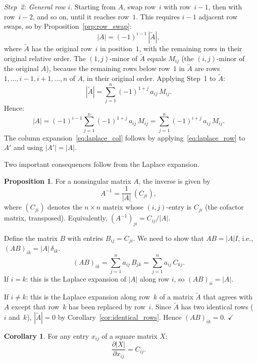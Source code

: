 \documentclass[12pt,a4paper]{article}
\makeatletter
\theoremstyle{definition}
\newtheorem{proposition}{Proposition}
\newtheorem{corollary}{Corollary}
\renewenvironment{proof}[1][\proofname]{\par
  \pushQED{\qed}%
  \normalfont \topsep6\p@\@plus6\p@\relax
  \trivlist
  \item[\hskip\labelsep\bfseries #1\@addpunct{.}]\ignorespaces
}{%
  \popQED\endtrivlist\@endpefalse
}
\makeatother
\begin{document}
\begin{proof}
\emph{Step~2: General row $i$.}
Starting from $A$, swap row~$i$ with row~$i-1$, then with row~$i-2$, and so on, until it reaches row~$1$. This requires $i - 1$ adjacent row swaps, so by Proposition~\ref{prp:row_swap}:
\[
|A| = (-1)^{i-1}\, |\tilde{A}|,
\]
where $\tilde{A}$ has the original row~$i$ in position~$1$, with the remaining rows in their original relative order. The $(1,j)$-minor of $\tilde{A}$ equals $M_{ij}$ (the $(i,j)$-minor of the original $A$), because the remaining rows below row~$1$ in $\tilde{A}$ are rows $1, \dots, i{-}1, i{+}1, \dots, n$ of $A$, in their original order. Applying Step~1 to $\tilde{A}$:
\[
|\tilde{A}| = \sum_{j=1}^{n} (-1)^{1+j}\, a_{ij}\, M_{ij}.
\]
Hence:
\[
|A| = (-1)^{i-1} \sum_{j=1}^{n} (-1)^{1+j}\, a_{ij}\, M_{ij} = \sum_{j=1}^{n} (-1)^{i+j}\, a_{ij}\, M_{ij}.
\]
The column expansion~\eqref{eq:laplace_col} follows by applying~\eqref{eq:laplace_row} to $A'$ and using $|A'| = |A|$.
\end{proof}

Two important consequences follow from the Laplace expansion.

\begin{proposition}\label{prp:cofactor_inverse}
For a nonsingular matrix $A$, the inverse is given by
\[
A^{-1} = \frac{1}{|A|}\, (C_{ji}),
\]
where $(C_{ji})$ denotes the $n \times n$ matrix whose $(i,j)$-entry is $C_{ji}$ (the cofactor matrix, transposed). Equivalently, $(A^{-1})_{ji} = C_{ij}/|A|$.
\end{proposition}

\begin{proof}
Define the matrix $B$ with entries $B_{ij} = C_{ji}$. We need to show that $AB = |A| I$, i.e., $(AB)_{ik} = |A|\, \delta_{ik}$.
\[
(AB)_{ik} = \sum_{j=1}^{n} a_{ij}\, B_{jk} = \sum_{j=1}^{n} a_{ij}\, C_{kj}.
\]
If $i = k$: this is the Laplace expansion of $|A|$ along row $i$, so $(AB)_{ii} = |A|$.

If $i \neq k$: this is the Laplace expansion along row~$k$ of a matrix $\tilde{A}$ that agrees with $A$ except that row~$k$ has been replaced by row~$i$. Since $\tilde{A}$ has two identical rows ($i$ and~$k$), $|\tilde{A}| = 0$ by Corollary~\ref{cor:identical_rows}. Hence $(AB)_{ik} = 0$. $\checkmark$
\end{proof}

\begin{corollary}\label{cor:partial_det}
For any entry $x_{ij}$ of a square matrix $X$:
\[
\frac{\partial |X|}{\partial x_{ij}} = C_{ij}.
\]
\end{corollary}
\end{document}
